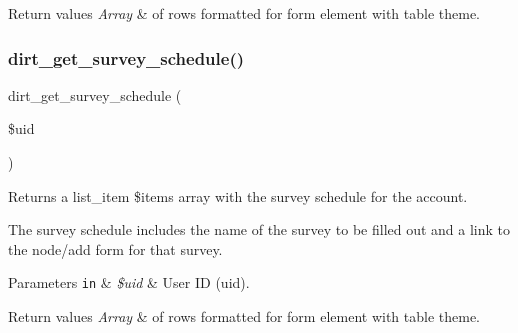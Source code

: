 \begin{DoxyRetVals}{Return values}
{\em Array} & of rows formatted for form element with \textquotesingle{}table\textquotesingle{} theme. \\
\hline
\end{DoxyRetVals}
\mbox{\label{dirt_8data__entry__portal_8inc_a7c65d904f5033eec0302f3ad738c39bb}} 
\subsubsection{\texorpdfstring{dirt\+\_\+get\+\_\+survey\+\_\+schedule()}{dirt\_get\_survey\_schedule()}}
{\footnotesize\ttfamily dirt\+\_\+get\+\_\+survey\+\_\+schedule (\begin{DoxyParamCaption}\item[{}]{\$uid }\end{DoxyParamCaption})}

Returns a list\+\_\+item \$items array with the survey schedule for the account.

The survey schedule includes the name of the survey to be filled out and a link to the node/add form for that survey.


\begin{DoxyParams}[1]{Parameters}
\mbox{\tt in}  & {\em \$uid} & User ID (uid).\\
\hline
\end{DoxyParams}

\begin{DoxyRetVals}{Return values}
{\em Array} & of rows formatted for form element with \textquotesingle{}table\textquotesingle{} theme. \\
\hline
\end{DoxyRetVals}
